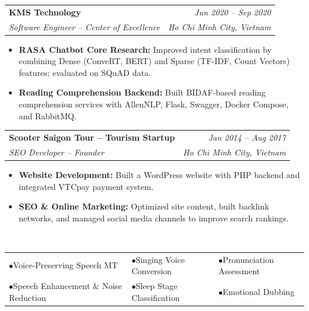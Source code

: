 \documentclass[10pt,a4paper]{article}
\makeatletter
\newcommand{\cventry}[4]{%
  \noindent
  \begin{tabular*}{\linewidth}{@{}l@{\extracolsep{\fill}}r@{}}
    {\color{accent}\textbf{#1}} & \textit{\small #2} \\
    \textit{\small #3} & \textit{\small #4}
  \end{tabular*}%
  \vspace{1pt}%
}
\makeatother
\begin{document}
\vspace{4pt}

\cventry{KMS Technology}{Jun 2020 -- Sep 2020}
        {Software Engineer -- Center of Excellence}{Ho Chi Minh City, Vietnam}
\begin{itemize}
  \item \textbf{RASA Chatbot Core Research:} Improved intent classification by combining Dense (ConveRT, BERT) and Sparse (TF-IDF, Count Vectors) features; evaluated on SQuAD data.
  \item \textbf{Reading Comprehension Backend:} Built BIDAF-based reading comprehension services with AllenNLP, Flask, Swagger, Docker Compose, and RabbitMQ.
\end{itemize}

\vspace{4pt}

\cventry{Scooter Saigon Tour -- Tourism Startup}{Jan 2014 -- Aug 2017}
        {SEO Developer -- Founder}{Ho Chi Minh City, Vietnam}
\begin{itemize}
  \item \textbf{Website Development:} Built a WordPress website with PHP backend and integrated VTCpay payment system.
  \item \textbf{SEO \& Online Marketing:} Optimized site content, built backlink networks, and managed social media channels to improve search rankings.
\end{itemize}

\vspace{4pt}

\\[2pt]
\noindent
\begin{tabular*}{\linewidth}{@{} l l l @{}}
  $\bullet$\;Voice-Preserving Speech MT &
  $\bullet$\;Singing Voice Conversion &
  $\bullet$\;Pronunciation Assessment \\
  $\bullet$\;Speech Enhancement \& Noise Reduction &
  $\bullet$\;Sleep Stage Classification &
  $\bullet$\;Emotional Dubbing \\
\end{tabular*}

\end{document}
